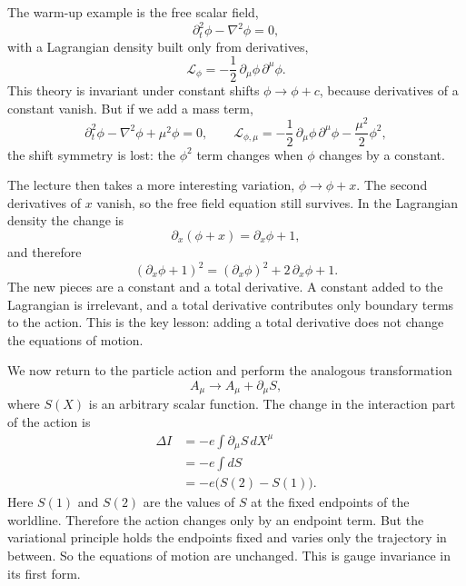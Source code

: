 The warm-up example is the free scalar field,
\begin{equation}
\partial_t^2\phi-\nabla^2\phi=0,
\end{equation}
with a Lagrangian density built only from derivatives,
\begin{equation}
\mathcal L_\phi=-\frac12\,\partial_\mu\phi\,\partial^\mu\phi.
\end{equation}
This theory is invariant under constant shifts \(\phi\to\phi+c\), because derivatives of a constant vanish. But if we add a mass term,
\begin{equation}
\partial_t^2\phi-\nabla^2\phi+\mu^2\phi=0,
\qquad
\mathcal L_{\phi,\mu}
=
-\frac12\,\partial_\mu\phi\,\partial^\mu\phi
-\frac{\mu^2}{2}\phi^2,
\end{equation}
the shift symmetry is lost: the \(\phi^2\) term changes when \(\phi\) changes by a constant.

The lecture then takes a more interesting variation, \(\phi\to\phi+x\). The second derivatives of \(x\) vanish, so the free field equation still survives. In the Lagrangian density the change is
\begin{equation}
\partial_x(\phi+x)=\partial_x\phi+1,
\end{equation}
and therefore
\begin{equation}
(\partial_x\phi+1)^2
=
(\partial_x\phi)^2+2\,\partial_x\phi+1.
\end{equation}
The new pieces are a constant and a total derivative. A constant added to the Lagrangian is irrelevant, and a total derivative contributes only boundary terms to the action. This is the key lesson: adding a total derivative does not change the equations of motion.

We now return to the particle action and perform the analogous transformation
\begin{equation}
A_\mu \longrightarrow A_\mu+\partial_\mu S,
\end{equation}
where \(S(X)\) is an arbitrary scalar function. The change in the interaction part of the action is
\begin{align}
\Delta I
&=
-e\int \partial_\mu S\,dX^\mu \\
&=
-e\int dS \\
&=
-e\bigl(S(2)-S(1)\bigr).
\end{align}
Here \(S(1)\) and \(S(2)\) are the values of \(S\) at the fixed endpoints of the worldline. Therefore the action changes only by an endpoint term. But the variational principle holds the endpoints fixed and varies only the trajectory in between. So the equations of motion are unchanged. This is gauge invariance in its first form.

